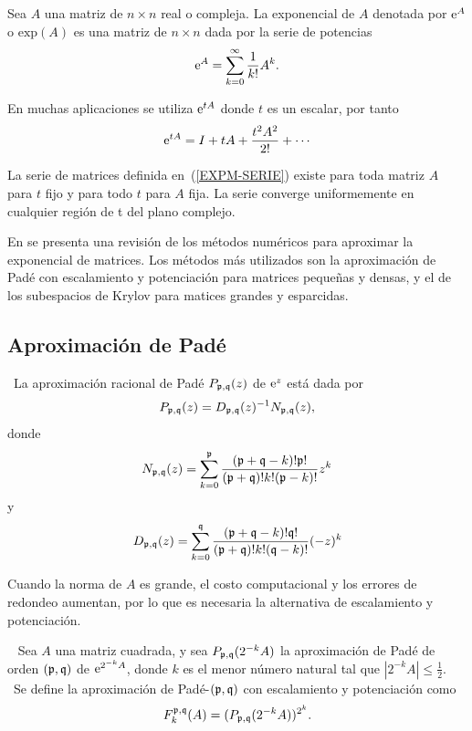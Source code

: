 \begin{definition}
    \label{EXPM}\cite{golub2013matrix} Sea $A$ una matriz de $n\times n$ real o compleja. La exponencial de $A$ denotada por
    $ \mathrm{e}^{A} $ o $\mathrm{exp}(A)$ es una matriz de $n\times n$ dada por la serie de potencias
    \[\mathrm{e}^{A}=\sum_{k=0}^{\infty}\frac{1}{k!}A^{k}.\]
\end{definition}
En muchas aplicaciones se utiliza $\mathrm{e}^{tA}$ donde $t$ es un escalar, por tanto 
\begin{equation}
\me{tA}=I+tA+\frac{t^{2}A^{2}}{2!}+\cdots\label{EXPM-SERIE}
\end{equation}
\begin{theorem}\cite{IntroMatrix}
    La serie de matrices definida en~(\ref{EXPM-SERIE}) existe para toda matriz $A$ para $t$ fijo y
    para todo $t$ para $A$ fija. La serie converge uniformemente en cualquier región de t del plano complejo.
\end{theorem}

En \cite{golub2013matrix} se presenta una revisión de los métodos numéricos
para aproximar
la exponencial de matrices. Los métodos más utilizados son la aproximación de Padé con escalamiento
y potenciación para matrices pequeñas y densas, y el de los subespacios de Krylov para matices grandes y esparcidas.


\subsection{Aproximación de Padé}\label{section:pade-approx}
\begin{definition}
    \cite{golub2013matrix}~La aproximación racional de Padé $P_{\mathfrak{p},\mathfrak{q}}(z)$
    de $\mathrm{e}^{z}$ está dada por 
    \begin{equation*}
    P_{\mathfrak{p},\mathfrak{q}}(z)=D_{\mathfrak{p},\mathfrak{q}}(z)^{-1}N_{\mathfrak{p},\mathfrak{q}}(z),  \label{FORM PADE}
    \end{equation*}%
    donde 
    \[
    N_{\mathfrak{p},\mathfrak{q}}(z)=\sum\limits_{k=0}^{\mathfrak{p}}\frac{(\mathfrak{p}+\mathfrak{q}-k)!\mathfrak{p}!}{(\mathfrak{p}+\mathfrak{q})!k!(\mathfrak{p}-k)!}z^k
    \]%
    y 
    \[
    D_{\mathfrak{p},\mathfrak{q}}(z)=\sum\limits_{k=0}^{\mathfrak{q}}\frac{(\mathfrak{p}+\mathfrak{q}-k)!\mathfrak{q}!}{(\mathfrak{p}+\mathfrak{q})!k!(\mathfrak{q}-k)!}(-z)^k
    \]
\end{definition}

Cuando la norma de   $A$ es grande, el costo computacional y los errores de redondeo  aumentan, por lo que
es necesaria la alternativa de escalamiento y potenciación.

\begin{definition}\cite{golub2013matrix}~
    Sea $A$ una matriz cuadrada, y sea $P_{\pf,\qf}(2^{-k}A%
    )$ la aproximación de Padé de orden $(\mathfrak{p},\mathfrak{q})\ $de $\me{2^{-k}A%
    }$, donde $k$ es el menor número natural tal que $\left\vert 2^{-k}A%
    \right\vert \leq \frac{1}{2}$. \ Se define la aproximación de  Padé-$(\mathfrak{p},\mathfrak{q})$ con escalamiento y potenciación como 
    \begin{equation}
    F_{k}^{\mathfrak{p},\mathfrak{q}}(A)=(P_{\mathfrak{p},\mathfrak{q}}(2^{-k}A))^{2^{k}}.
    \label{P-MA-2}
    \end{equation}
\end{definition}

